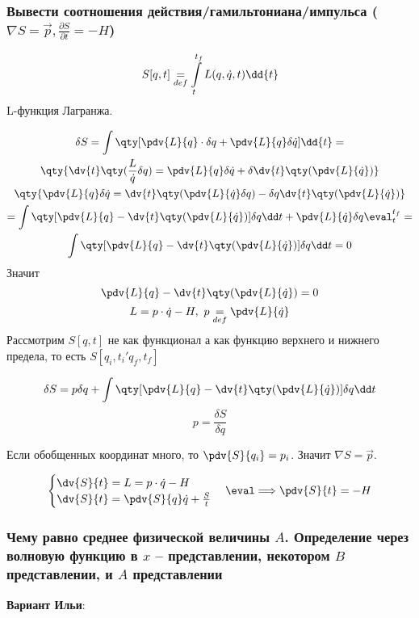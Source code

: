
\subsubsection{{Вывести соотношения действия/гамильтониана/импульса ($\nabla S=\vec{p},\frac{\partial S}{\partial t}=-H$)}}

$$ S[q,t]\definition \int \limits_t^{t_{f}} L(q,\dot q,t )\dd{t}$$
L-функция Лагранжа.

\begin{gather*}
	\delta S= \int \qty[\pdv{L}{q}\cdot \delta q + \pdv{L}{q} \delta \dot q]\dd{t}=\\
	\qty{\dv{t}\qty(\frac{L}{\dot q} \delta q) = \pdv{L}{q}\delta \dot q +
	\delta \dv{t}\qty(\pdv{L}{\dot q})
	}
	\\
	\qty{
	\pdv{L}{q} \delta \dot q= \dv{t}\qty(\pdv{L}{\dot q} \delta q)- \delta q
	\dv{t}\qty(\pdv{L}{\dot q})
	}\\
	=\int \qty[\pdv{L}{q}-\dv{t}\qty(\pdv{L}{\dot q})]\delta q \dd t + \pdv{L}{\dot q}\delta q \eval_t^{t_f}= \\
	\int \qty[\pdv{L}{q}-\dv{t}\qty(\pdv{L}{\dot q})]\delta q \dd t=0
\end{gather*}
Значит 
$$\pdv{L}{q}-\dv{t}\qty(\pdv{L}{\dot q})=0 $$
$$L=p\cdot \dot q -H, ~ p\definition\pdv{L}{\dot q}$$
Рассмотрим $S[q,t]$ не как функционал а как функцию верхнего и нижнего предела, то есть $S[q_i,t_i'q_f,t_f]$

$$\delta S= p \delta q + 	\int \qty[\pdv{L}{q}-\dv{t}\qty(\pdv{L}{\dot q})] \delta q \dd t  $$
$$p=\frac{\delta S}{\delta q}$$

Если обобщенных координат много, то $\pdv{S}{q_i}=p_i$. Значит $\nabla S=\vec p$.

\begin{gather*}
	\begin{cases}
		\dv{S}{t}=L=p\cdot \dot q -H \\
		\dv{S}{t}=\pdv{S}{q} \dot q +\frac{S}{t}
	\end{cases}
	\eval \Longrightarrow \pdv{S}{t}=-H
\end{gather*}


\subsubsection{{Чему равно среднее физической величины $A$. Определение через волновую функцию в $x$ -- представлении, некотором $B$ представлении, и $A$ представлении}}
\textbf{Вариант Ильи}:


